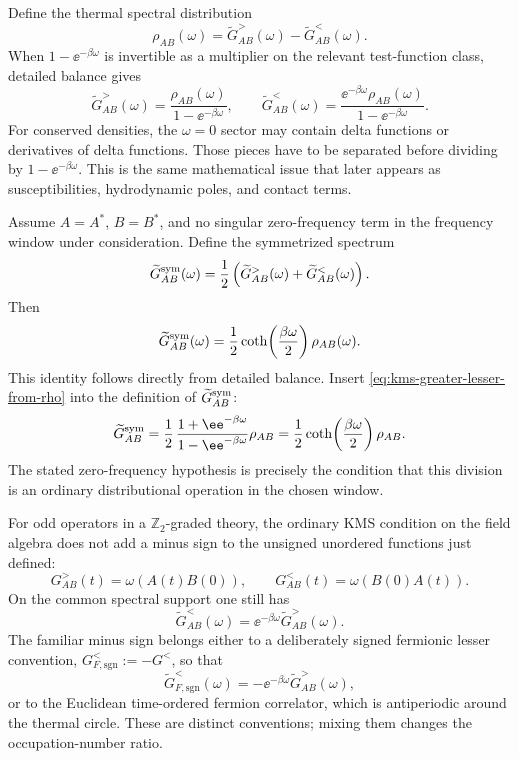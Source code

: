 Define the thermal spectral distribution
\begin{equation}
  \rho_{AB}(\omega)
  =
  \widetilde G_{AB}^{>}(\omega)
  -
  \widetilde G_{AB}^{<}(\omega).
  \label{eq:thermal-spectral-density-definition}
\end{equation}
When \(1-\ee^{-\beta\omega}\) is invertible as a multiplier on the relevant
test-function class, detailed balance gives
\begin{equation}
  \widetilde G_{AB}^{>}(\omega)
  =
  \frac{\rho_{AB}(\omega)}{1-\ee^{-\beta\omega}},
  \qquad
  \widetilde G_{AB}^{<}(\omega)
  =
  \frac{\ee^{-\beta\omega}\rho_{AB}(\omega)}
       {1-\ee^{-\beta\omega}} .
  \label{eq:kms-greater-lesser-from-rho}
\end{equation}
For conserved densities, the \(\omega=0\) sector may contain delta functions
or derivatives of delta functions.  Those pieces have to be separated before
dividing by \(1-\ee^{-\beta\omega}\).  This is the same mathematical issue
that later appears as susceptibilities, hydrodynamic poles, and contact
terms.

\begin{remark}
\label{rem:bosonic-fdt-kms}
Assume \(A=A^\ast\), \(B=B^\ast\), and no singular zero-frequency term in the
frequency window under consideration.  Define the symmetrized spectrum
\[
  \widetilde G^{\rm sym}_{AB}(\omega)
  =
  \frac12\left(
  \widetilde G_{AB}^{>}(\omega)+
  \widetilde G_{AB}^{<}(\omega)
  \right).
\]
Then
\begin{equation}
  \widetilde G^{\rm sym}_{AB}(\omega)
  =
  \frac12\coth\!\left(\frac{\beta\omega}{2}\right)\rho_{AB}(\omega).
  \label{eq:bosonic-fluctuation-dissipation}
\end{equation}
This identity follows directly from detailed balance.  Insert
\eqref{eq:kms-greater-lesser-from-rho} into the definition of
\(\widetilde G^{\rm sym}_{AB}\):
\[
  \widetilde G^{\rm sym}_{AB}
  =
  \frac12\,\frac{1+\ee^{-\beta\omega}}
  {1-\ee^{-\beta\omega}}\rho_{AB}
  =
  \frac12\coth\!\left(\frac{\beta\omega}{2}\right)\rho_{AB}.
\]
The stated zero-frequency hypothesis is precisely the condition that this
division is an ordinary distributional operation in the chosen window.
\end{remark}

For odd operators in a \(\mathbb Z_2\)-graded theory, the ordinary KMS
condition on the field algebra does not add a minus sign to the unsigned
unordered functions just defined:
\[
  G^>_{AB}(t)=\omega(A(t)B(0)),
  \qquad
  G^<_{AB}(t)=\omega(B(0)A(t)).
\]
On the common spectral support one still has
\[
  \widetilde G^{<}_{AB}(\omega)
  =
  \ee^{-\beta\omega}\widetilde G^{>}_{AB}(\omega).
\]
The familiar minus sign belongs either to a deliberately signed fermionic
lesser convention, \(G^{<}_{F,\mathrm{sgn}}:=-G^<\), so that
\[
  \widetilde G^{<}_{F,\mathrm{sgn}}(\omega)
  =
  -\ee^{-\beta\omega}\widetilde G^{>}_{AB}(\omega),
\]
or to the Euclidean time-ordered fermion correlator, which is antiperiodic
around the thermal circle.  These are distinct conventions; mixing them changes
the occupation-number ratio.

